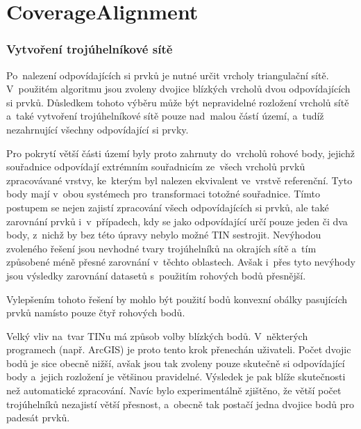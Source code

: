 \section{CoverageAlignment}
\label{problemy-ca}

\subsubsection{Vytvoření trojúhelníkové sítě}
Po~nalezení odpovídajících si prvků je nutné určit vrcholy triangulační sítě.
V~použitém algoritmu jsou zvoleny dvojice blízkých vrcholů dvou odpovídajících
si prvků. Důsledkem tohoto výběru může být nepravidelné rozložení vrcholů sítě
a~také vytvoření troj\-úhelníkové sítě pouze nad~malou částí území, a~tudíž 
nezahrnující všechny odpovídající si prvky.

Pro pokrytí větší části území byly proto zahrnuty do~vrcholů rohové body, jejichž
souřadnice odpovídají extrémním souřadnicím ze~všech vrcholů prvků zpracovávané 
vrstvy, ke~kterým byl nalezen ekvivalent ve~vrstvě referenční. Tyto body mají 
v~obou systémech pro~transformaci totožné souřadnice. Tímto postupem se nejen 
zajistí zpracování všech odpovídajících si prvků, ale také zarovnání prvků 
i~v~případech, kdy se jako odpovídající určí pouze jeden či dva body, z~nichž 
by bez této úpravy nebylo možné TIN sestrojit. Nevýhodou zvoleného řešení jsou 
nevhodné tvary trojúhelníků na okrajích sítě a~tím způsobené méně přesné zarovnání 
v~těchto oblastech. Avšak i~přes tyto nevýhody jsou výsledky zarovnání datasetů 
s~použitím rohových bodů přesnější. 

Vylepšením tohoto řešení by mohlo být použití bodů konvexní obálky pasujících
prvků namísto pouze čtyř rohových bodů.

Velký vliv na~tvar TINu má způsob volby blízkých bodů. V~některých programech
(např. ArcGIS) je proto tento krok přenechán uživateli. Počet dvojic bodů je
sice obecně nižší, avšak jsou tak zvoleny pouze skutečně si odpovídající body
a~jejich rozložení je většinou pravidelné. Výsledek je pak blíže skutečnosti
než automatické zpracování. Navíc bylo experimentálně zjištěno, že větší počet
trojúhelníků nezajistí větší přesnost, a~obecně tak postačí jedna dvojice
bodů pro padesát prvků. %

